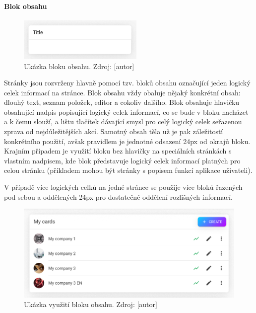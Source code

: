 			\paragraph{Blok obsahu}

			\begin{figure}[H]
				\centering
				\includegraphics[width=6cm]{obrazky/blok_obsahu}\hfill
				\caption{Ukázka bloku obsahu. Zdroj: [autor]}
			\end{figure}

			Stránky jsou rozvrženy hlavně pomocí tzv. bloků obsahu označující jeden logický celek informací
			na stránce.
			Blok obsahu vždy obaluje nějaký konkrétní obsah: dlouhý text, seznam položek, editor a cokoliv dalšího.
			Blok obsahuje hlavičku obsahující nadpis popisující logický celek informací, co se bude v bloku nacházet
			a k čemu slouží, a lištu tlačítek dávající smysl pro celý logický celek seřazenou zprava od nejdůležitějších
			akcí.
			Samotný obsah těla už je pak záležitostí konkrétního použití, avšak pravidlem je jednotné odsazení 24px od
			okrajů bloku.
			Krajním případem je využití bloku bez hlavičky na speciálních stránkách s vlastním nadpisem, kde blok
			představuje logický celek informací platných pro celou stránku (příkladem mohou být stránky s popisem
			funkcí aplikace uživateli).

			V případě více logických celků na jedné stránce se použije více bloků řazených pod sebou a oddělených 24px
			pro dostatečné oddělení rozlišných informací.

			\begin{figure}[H]
				\centering
				\includegraphics[width=\linewidth]{obrazky/blok_obsahu_ukazka}\hfill
				\caption{Ukázka využití bloku obsahu. Zdroj: [autor]}
			\end{figure}


